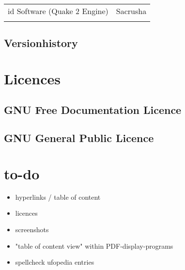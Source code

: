 \begin{tabular}{lr}
id Software (Quake 2 Engine)  & Sacrusha 					\\ 
 												&  									\\ 
\end{tabular}
\newpage

\subsection{Versionhistory}

\section{Licences}

\subsection{GNU Free Documentation Licence}

\subsection{GNU General Public Licence}

\section{to-do}
\begin{itemize}
\item hyperlinks / table of content
\item licences
\item screenshots
\item "table of content view" within PDF-display-programs
\item spellcheck ufopedia entries
\end{itemize}